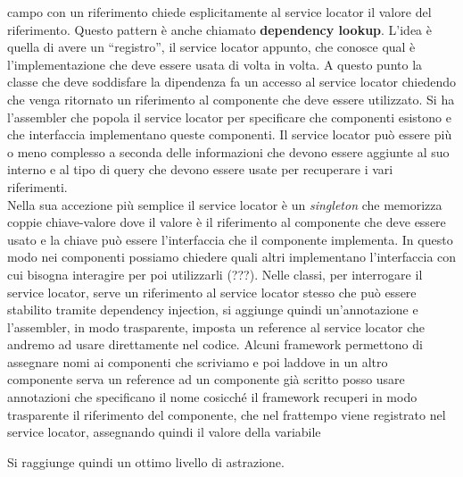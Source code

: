 \documentclass[a4paper,12pt, oneside]{book}
\begin{document}
\begin{itemize}
  campo con un riferimento chiede esplicitamente al service locator il valore
  del riferimento. Questo pattern è anche chiamato \textbf{dependency
    lookup}. L'idea è quella di avere un ``registro'', il service locator
  appunto, che conosce qual è l'implementazione che deve essere usata di volta
  in volta. A questo punto la classe che deve soddisfare la dipendenza fa un
  accesso al service locator chiedendo che venga ritornato un riferimento al
  componente che deve essere utilizzato. Si ha l'assembler che popola il service
  locator per specificare che componenti esistono e che interfaccia implementano
  queste componenti. Il service locator può essere più o meno complesso a
  seconda delle informazioni che devono essere aggiunte al suo interno e al tipo
  di query che devono essere usate per recuperare i vari riferimenti.\\
  Nella sua accezione più semplice il service locator è un \textit{singleton}
  che memorizza coppie chiave-valore dove il valore è il riferimento al
  componente che deve essere usato e la chiave può essere l'interfaccia che il
  componente implementa. In questo modo nei componenti possiamo chiedere quali
  altri implementano l'interfaccia con cui bisogna interagire per poi
  utilizzarli (???). Nelle classi, per interrogare il service locator, serve un
  riferimento al service locator stesso che può essere stabilito tramite
  dependency injection, si aggiunge quindi un'annotazione e l'assembler, in modo
  trasparente, imposta un reference al service locator che andremo ad usare
  direttamente nel codice. Alcuni framework permettono di assegnare nomi ai
  componenti che scriviamo e poi laddove in un altro componente serva un
  reference ad un componente già scritto posso usare annotazioni che
  specificano il nome cosicché il framework recuperi in modo trasparente il
  riferimento del componente, che nel frattempo viene registrato nel service
  locator, assegnando quindi il valore della variabile 
\end{itemize}
Si raggiunge quindi un ottimo livello di astrazione.\\
\end{document}

